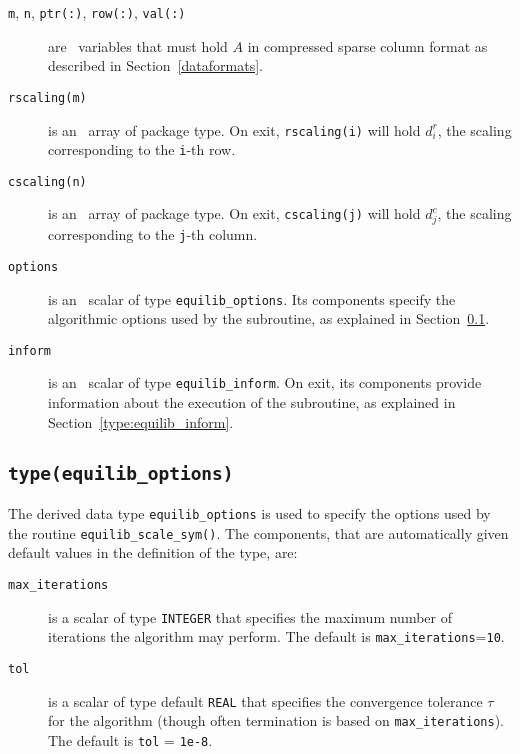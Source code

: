 \begin{description}

\item[\texttt{m}, \texttt{n}, \texttt{ptr(:)}, \texttt{row(:)}, \texttt{val(:)}] are \intentin\ variables that must hold $A$ in compressed sparse column format as described in Section~\ref{dataformats}.

\item[\texttt{rscaling(m)}] is an \intentout\ array of package type. On exit,
\texttt{rscaling(i)} will hold $d^r_i$, the scaling corresponding to the
\texttt{i}-th row.

\item[\texttt{cscaling(n)}] is an \intentout\ array of package type. On exit,
\texttt{cscaling(j)} will hold $d^c_j$, the scaling corresponding to the
\texttt{j}-th column.

\item[\texttt{options}] is an \intentin\ scalar of type \texttt{equilib\_options}. Its components specify the algorithmic options used by the subroutine, as explained in Section~\ref{type:equilib_options}.

\item[\texttt{inform}] is an \intentout\ scalar of type \texttt{equilib\_inform}. On exit, its components provide information about the execution of the subroutine, as explained in Section~\ref{type:equilib_inform}.

\end{description}

\subsection{\texttt{type(equilib\_options)}} \label{type:equilib_options}

The derived data type \texttt{equilib\_options} is used to specify the options
used by the routine \texttt{equilib\_scale\_sym()}. The components, that are
automatically given default values in the definition of the type, are:

\begin{description}

\item[\texttt{max\_iterations}] is a scalar of type \texttt{INTEGER} that specifies the maximum number of iterations the algorithm may perform. The default is \texttt{max\_iterations}=\texttt{10}.

\item[\texttt{tol}] is a scalar of type default \texttt{REAL} that specifies the convergence tolerance $\tau$ for the algorithm (though often termination is based on \texttt{max\_iterations}). The default is \texttt{tol} = \texttt{1e-8}.

\end{description}

